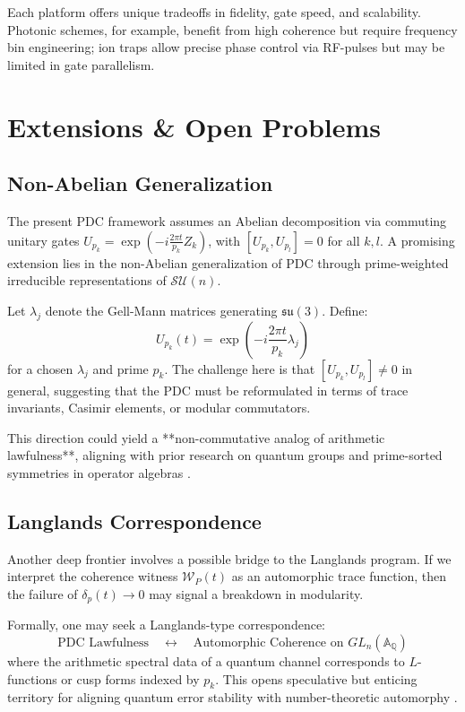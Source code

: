 \documentclass[12]{amsart}
\theoremstyle{plain}
\begin{document}
Each platform offers unique tradeoffs in fidelity, gate speed, and scalability. Photonic schemes, for example, benefit from high coherence but require frequency bin engineering; ion traps allow precise phase control via RF-pulses but may be limited in gate parallelism.

\section{Extensions \& Open Problems}

\subsection{Non-Abelian Generalization}

The present PDC framework assumes an Abelian decomposition via commuting unitary gates $U_{p_k} = \exp(-i \frac{2\pi t}{p_k} Z_k)$, with $[U_{p_k}, U_{p_l}] = 0$ for all $k,l$. A promising extension lies in the non-Abelian generalization of PDC through prime-weighted irreducible representations of $\mathcal{SU}(n)$.

Let $\lambda_j$ denote the Gell-Mann matrices generating $\mathfrak{su}(3)$. Define:
\[
U_{p_k}(t) = \exp\left( -i \frac{2\pi t}{p_k} \lambda_j \right)
\]
for a chosen $\lambda_j$ and prime $p_k$. The challenge here is that $[U_{p_k}, U_{p_l}] \neq 0$ in general, suggesting that the PDC must be reformulated in terms of trace invariants, Casimir elements, or modular commutators.

This direction could yield a **non-commutative analog of arithmetic lawfulness**, aligning with prior research on quantum groups and prime-sorted symmetries in operator algebras \cite{etingof2009quantum}.

\subsection{Langlands Correspondence}

Another deep frontier involves a possible bridge to the Langlands program. If we interpret the coherence witness $\mathcal{W}_P(t)$ as an automorphic trace function, then the failure of $\delta_p(t) \to 0$ may signal a breakdown in modularity.

Formally, one may seek a Langlands-type correspondence:
\[
\text{PDC Lawfulness} \quad \longleftrightarrow \quad \text{Automorphic Coherence on } GL_n(\mathbb{A}_\mathbb{Q})
\]
where the arithmetic spectral data of a quantum channel corresponds to $L$-functions or cusp forms indexed by $p_k$. This opens speculative but enticing territory for aligning quantum error stability with number-theoretic automorphy \cite{frenkel2007langlands}.
\end{document}
